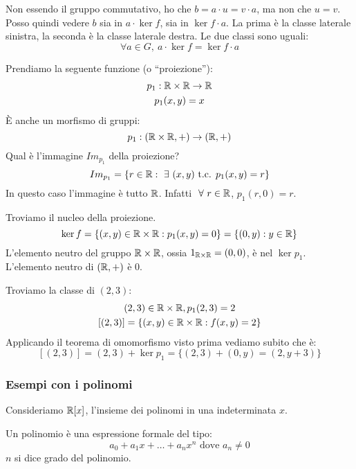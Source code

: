 Non essendo il gruppo commutativo, ho che $b = a \cdot u = v \cdot a$, ma non che $u = v$. Posso quindi vedere $b$ sia in $ a \cdot \ker f$, sia in $\ker f \cdot a$. La prima \`e la classe laterale sinistra, la seconda \`e la classe laterale destra. Le due classi sono uguali:
\[
\forall a \in G ,\ a \cdot \ker f = \ker f \cdot a
\]
\begin{exmp}
Prendiamo la seguente funzione (o ``proiezione''):
\begin{gather*}
p_1 : \mathbb{R} \times \mathbb{R} \to \mathbb{R} \\
p_1 (x, y) = x
\end{gather*}
\`E anche un morfismo di gruppi:
\[
p_1 : (\mathbb{R} \times \mathbb{R}, +) \to (\mathbb{R}, +)
\]
Qual \`e l'immagine $Im_{p_1}$ della proiezione?
\[
Im_{p_1} = \{ r \in \reals : \exists (x, y) \text{ t.c. } p_1 (x, y) = r \}
\]
In questo caso l'immagine \`e tutto $\mathbb{R}$. Infatti $\forall r \in \reals$, $ p_1(r, 0) = r$.

Troviamo il nucleo della proiezione.
\[
\ker f = \{ (x, y) \in \mathbb{R} \times \mathbb{R} : p_1(x, y) = 0 \} = \{ (0, y) : y \in \mathbb{R} \}
\]
L'elemento neutro del gruppo $\mathbb{R} \times \mathbb{R}$, ossia $1_{\mathbb{R} \times \mathbb{R}} = (0, 0)$, \`e nel $ \ker p_1$. L'elemento neutro di $(\mathbb{R}, +)$ \`e 0.

Troviamo la classe di $(2, 3)$:
\begin{gather*}
(2, 3) \in \mathbb{R} \times \mathbb{R}, p_1(2, 3) = 2 \\
[(2, 3)] = \{ (x, y) \in \mathbb{R} \times \mathbb{R} : f(x, y) = 2\}
\end{gather*}
Applicando il teorema di omomorfismo visto prima vediamo subito che \`e:
\[
[(2,3)] = (2, 3) + \ker p_1 = \{ (2, 3) + (0, y) = (2, y + 3) \}
\]
\end{exmp}

\subsubsection{Esempi con i polinomi}

Consideriamo $\mathbb{R}[x]$, l'insieme dei polinomi in una indeterminata $x$.

\begin{defn}[Polinomio]
Un polinomio \`e una espressione formale del tipo:
\[
a_0 + a_1 x + \dots + a_n x^n \text{ dove } a_n \neq 0
\]
$n$ si dice grado del polinomio.
\end{defn}


